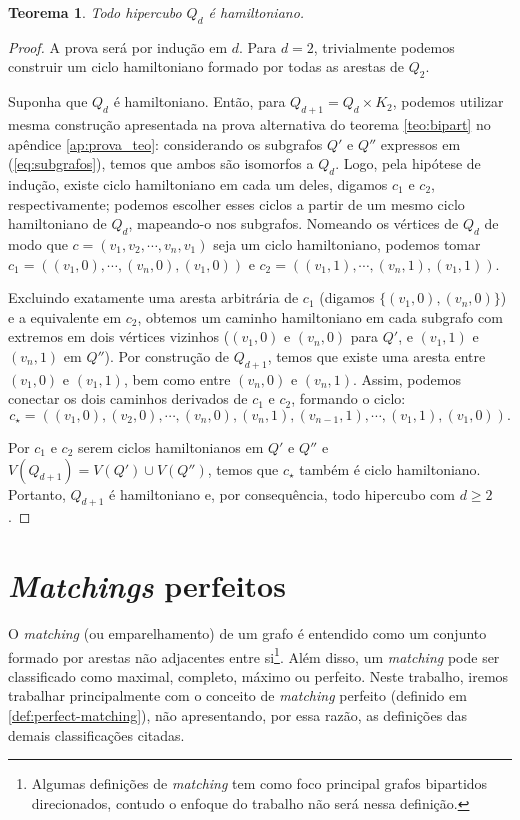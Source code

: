 \documentclass[12pt, a4paper]{article}
\newtheorem{theorem}{Teorema}[section]
\begin{document}
\begin{theorem}\label{teo:hamilt}
    Todo hipercubo $Q_d$ é hamiltoniano.
\end{theorem}

\begin{proof}
    A prova será por indução em $d$. Para $d=2$, trivialmente podemos construir um ciclo hamiltoniano formado por todas as arestas de $Q_2$. 
    
    Suponha que $Q_d$ é hamiltoniano. Então, para $Q_{d+1} = Q_d \times K_2$, podemos utilizar mesma construção apresentada na prova alternativa do teorema \ref{teo:bipart} no apêndice \ref{ap:prova_teo}: considerando os subgrafos $Q'$ e $Q''$ expressos em (\ref{eq:subgrafos}), temos que ambos são isomorfos a $Q_d$. Logo, pela hipótese de indução, existe ciclo hamiltoniano em cada um deles, digamos $c_1$ e $c_2$, respectivamente; podemos escolher esses ciclos a partir de um mesmo ciclo hamiltoniano de $Q_d$, mapeando-o nos subgrafos. Nomeando os vértices de $Q_d$ de modo que $c = (v_1, v_2, \cdots, v_n, v_1)$ seja um ciclo hamiltoniano, podemos tomar $c_1 = ((v_1, 0), \cdots, (v_n, 0), (v_1, 0))$ e $c_2 = ((v_1, 1), \cdots, (v_n, 1), (v_1, 1))$.
    
    Excluindo exatamente uma aresta arbitrária de $c_1$ (digamos $\{(v_1, 0), (v_n, 0)\}$) e a equivalente em $c_2$, obtemos um caminho hamiltoniano em cada subgrafo com extremos em dois vértices vizinhos ($(v_1, 0)$ e $(v_n, 0)$ para $Q'$, e $(v_1, 1)$ e $(v_n, 1)$ em $Q''$). Por construção de $Q_{d+1}$, temos que existe uma aresta entre $(v_1, 0)$ e $(v_1, 1)$, bem como entre $(v_n, 0)$ e $(v_n, 1)$. Assim, podemos conectar os dois caminhos derivados de $c_1$ e $c_2$, formando o ciclo:
    $$
    c_{\star} = ((v_1, 0), (v_2, 0), \cdots, (v_n, 0), (v_n, 1), (v_{n-1}, 1), \cdots, (v_1, 1), (v_1, 0)).
    $$

    Por $c_1$ e $c_2$ serem ciclos hamiltonianos em $Q'$ e $Q''$ e $V(Q_{d+1}) = V(Q') \cup V(Q'')$, temos que $c_{\star}$ também é ciclo hamiltoniano. Portanto, $Q_{d+1}$ é hamiltoniano e, por consequência, todo hipercubo com $d\geq 2$.
\end{proof}


\section{\textit{Matchings} perfeitos}

O \textit{matching} (ou emparelhamento) de um grafo é entendido como um conjunto formado por arestas não adjacentes entre si\footnote{Algumas definições de \textit{matching} tem como foco principal grafos bipartidos direcionados, contudo o enfoque do trabalho não será nessa definição.}. Além disso, um \textit{matching} pode ser classificado como maximal, completo, máximo ou perfeito. Neste trabalho, iremos trabalhar principalmente com o conceito de \textit{matching} perfeito (definido em \ref{def:perfect-matching}), não apresentando, por essa razão, as definições das demais classificações citadas.
\end{document}
